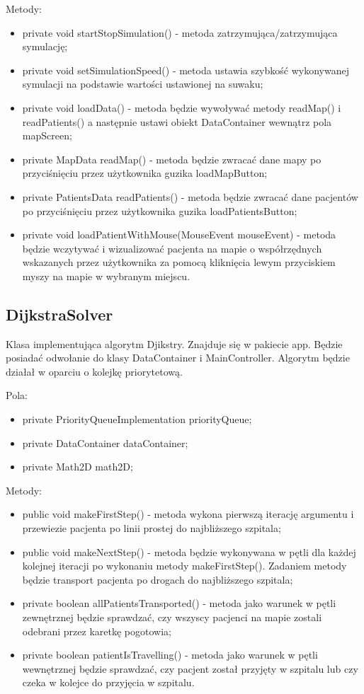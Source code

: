 \documentclass{article}
\begin{document}
    Metody:
    \begin{itemize}
        \item private void startStopSimulation() - metoda zatrzymująca/zatrzymująca symulację;
        \item private void setSimulationSpeed() - metoda ustawia szybkość wykonywanej symulacji na podstawie wartości ustawionej na suwaku;
        \item private void loadData() - metoda będzie wywoływać metody readMap() i readPatients() a następnie ustawi obiekt DataContainer wewnątrz pola mapScreen;
        \item private MapData readMap() - metoda będzie zwracać dane mapy po przyciśnięciu przez użytkownika guzika loadMapButton;
        \item private PatientsData readPatients() - metoda będzie zwracać dane pacjentów po przyciśnięciu przez użytkownika guzika loadPatientsButton;
        \item private void loadPatientWithMouse(MouseEvent mouseEvent) - metoda będzie wczytywać i wizualizować pacjenta na mapie o współrzędnych wskazanych przez użytkownika za pomocą kliknięcia lewym przyciskiem myszy na mapie w wybranym miejscu.
    \end{itemize}

    \subsection{DijkstraSolver}
    Klasa implementująca algorytm Djikstry. Znajduje się w pakiecie app. Będzie posiadać odwołanie do klasy DataContainer i MainController. Algorytm będzie działał w oparciu o kolejkę priorytetową.

     Pola:
    \begin{itemize}
        \item private PriorityQueueImplementation priorityQueue;
        \item private DataContainer dataContainer;
        \item private Math2D math2D;
    \end{itemize}

    Metody:
    \begin{itemize}
        \item public void makeFirstStep() - metoda wykona pierwszą iterację argumentu i przewiezie pacjenta po linii prostej do najbliższego szpitala;
        \item public void makeNextStep() - metoda będzie wykonywana w pętli dla każdej kolejnej iteracji po wykonaniu metody makeFirstStep(). Zadaniem metody będzie transport pacjenta po drogach do najbliższego szpitala;
        \item private boolean allPatientsTransported()  - metoda jako warunek w pętli zewnętrznej będzie sprawdzać, czy wszyscy pacjenci na mapie zostali odebrani przez karetkę pogotowia;
        \item private boolean patientIsTravelling()  - metoda jako warunek w pętli wewnętrznej będzie sprawdzać, czy pacjent został przyjęty w szpitalu lub czy czeka w kolejce do przyjęcia w szpitalu.
    \end{itemize}
\end{document}
